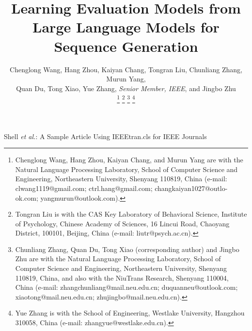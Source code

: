 \documentclass[lettersize,journal]{IEEEtran}
\begin{document}
\title{Learning Evaluation Models from Large Language Models for Sequence Generation}

\author{Chenglong Wang, Hang Zhou, Kaiyan Chang, Tongran Liu, Chunliang Zhang, Murun Yang, \\ Quan Du, Tong Xiao, Yue Zhang, \textit{Senior Member, IEEE}, and Jingbo Zhu

\thanks{Chenglong Wang, Hang Zhou, Kaiyan Chang, and Murun Yang are with the Natural Language Processing Laboratory, School of Computer Science and Engineering, Northeastern University, Shenyang 110819, China (e-mail: clwang1119@gmail.com; ctrl.hang@gmail.com; changkaiyan1027@outlo-ok.com; yangmurun@outlook.com).}
\thanks{Tongran Liu is with the CAS Key Laboratory of Behavioral Science, Institute of Psychology, Chinese Academy of Sciences, 16 Lincui Road, Chaoyang District, 100101, Beijing, China (e-mail: liutr@psych.ac.cn).}
\thanks{Chunliang Zhang, Quan Du, Tong Xiao (corresponding author) and Jingbo Zhu are with the Natural Language Processing Laboratory, School of Computer Science and Engineering, Northeastern University,
Shenyang 110819, China, and also with the NiuTrans Research, Shenyang 110004, China (e-mail: zhangchunliang@mail.neu.edu.cn;
duquanneu@outlook.com;
xiaotong@mail.neu.edu.cn; zhujingbo@mail.neu.edu.cn).}
\thanks{
Yue Zhang is with the School of Engineering, Westlake University, Hangzhou 310058, China (e-mail: zhangyue@westlake.edu.cn).}
}

{Shell \MakeLowercase{\textit{et al.}}: A Sample Article Using IEEEtran.cls for IEEE Journals}


\maketitle
\end{document}
